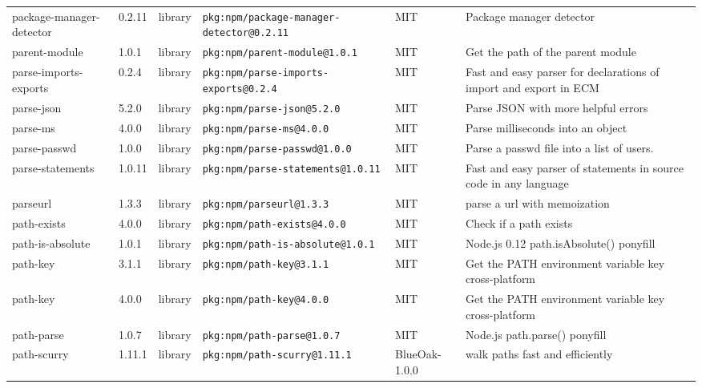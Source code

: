 \documentclass[11pt,a4paper]{article}
\begin{document}
\begin{longtable}{|p{4cm}|p{2cm}|p{1.6cm}|p{5cm}|p{1.5cm}|p{3.5cm}|}
\raggedright package-manager-detector & 0.2.11 & library & \small\texttt{pkg:npm/package-manager-detector@0.2.11} & MIT & \small Package manager detector \\
\raggedright parent-module & 1.0.1 & library & \small\texttt{pkg:npm/parent-module@1.0.1} & MIT & \small Get the path of the parent module \\
\raggedright parse-imports-exports & 0.2.4 & library & \small\texttt{pkg:npm/parse-imports-exports@0.2.4} & MIT & \small Fast and easy parser for declarations of import and export in ECM \\
\raggedright parse-json & 5.2.0 & library & \small\texttt{pkg:npm/parse-json@5.2.0} & MIT & \small Parse JSON with more helpful errors \\
\raggedright parse-ms & 4.0.0 & library & \small\texttt{pkg:npm/parse-ms@4.0.0} & MIT & \small Parse milliseconds into an object \\
\raggedright parse-passwd & 1.0.0 & library & \small\texttt{pkg:npm/parse-passwd@1.0.0} & MIT & \small Parse a passwd file into a list of users. \\
\raggedright parse-statements & 1.0.11 & library & \small\texttt{pkg:npm/parse-statements@1.0.11} & MIT & \small Fast and easy parser of statements in source code in any language \\
\raggedright parseurl & 1.3.3 & library & \small\texttt{pkg:npm/parseurl@1.3.3} & MIT & \small parse a url with memoization \\
\raggedright path-exists & 4.0.0 & library & \small\texttt{pkg:npm/path-exists@4.0.0} & MIT & \small Check if a path exists \\
\raggedright path-is-absolute & 1.0.1 & library & \small\texttt{pkg:npm/path-is-absolute@1.0.1} & MIT & \small Node.js 0.12 path.isAbsolute() ponyfill \\
\raggedright path-key & 3.1.1 & library & \small\texttt{pkg:npm/path-key@3.1.1} & MIT & \small Get the PATH environment variable key cross-platform \\
\raggedright path-key & 4.0.0 & library & \small\texttt{pkg:npm/path-key@4.0.0} & MIT & \small Get the PATH environment variable key cross-platform \\
\raggedright path-parse & 1.0.7 & library & \small\texttt{pkg:npm/path-parse@1.0.7} & MIT & \small Node.js path.parse() ponyfill \\
\raggedright path-scurry & 1.11.1 & library & \small\texttt{pkg:npm/path-scurry@1.11.1} & BlueOak-1.0.0 & \small walk paths fast and efficiently \\

\end{longtable}
\end{document}
